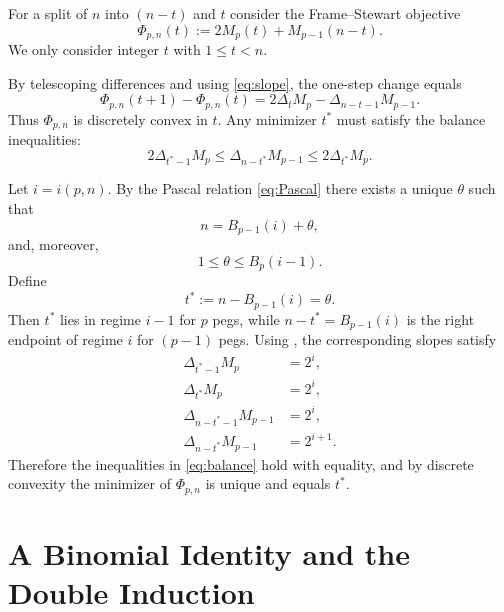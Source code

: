 \documentclass[11pt]{article}
\theoremstyle{definition}
\begin{document}
For a split of $n$ into $(n-t)$ and $t$ consider the Frame--Stewart objective
\begin{equation}\label{eq:phi}
\Phi_{p,n}(t) := 2M_p(t) + M_{p-1}(n-t).
\end{equation}
We only consider integer $t$ with $1 \leq t < n$.

By telescoping differences and using \eqref{eq:slope}, the one-step change equals
\begin{equation}\label{eq:phidiff}
\Phi_{p,n}(t+1) - \Phi_{p,n}(t) = 2\Delta_t M_p - \Delta_{n-t-1} M_{p-1}.
\end{equation}
Thus $\Phi_{p,n}$ is discretely convex in $t$. Any minimizer $t^*$ must satisfy the balance inequalities:
\begin{equation}\label{eq:balance}
2\Delta_{t^*-1} M_p \leq \Delta_{n-t^*} M_{p-1} \leq 2\Delta_{t^*} M_p.
\end{equation}

Let $i = i(p,n)$. By the Pascal relation \eqref{eq:Pascal} there exists a unique $\theta$ such that
\begin{equation}\label{eq:thetaA}
n = B_{p-1}(i) + \theta,
\end{equation}
and, moreover,
\begin{equation}\label{eq:thetaB}
1 \leq \theta \leq B_p(i-1).
\end{equation}
Define
\begin{equation}\label{eq:tstar}
t^* := n - B_{p-1}(i) = \theta.
\end{equation}
Then $t^*$ lies in regime $i-1$ for $p$ pegs, while $n - t^* = B_{p-1}(i)$ is the right endpoint of regime $i$ for $(p-1)$ pegs. Using , the corresponding slopes satisfy
\begin{align}
\Delta_{t^*-1} M_p &= 2^i, \label{eq:d1} \\
\Delta_{t^*} M_p &= 2^i, \label{eq:d2} \\
\Delta_{n-t^*-1} M_{p-1} &= 2^i, \label{eq:d3} \\
\Delta_{n-t^*} M_{p-1} &= 2^{i+1}. \label{eq:d4}
\end{align}
Therefore the inequalities in \eqref{eq:balance} hold with equality, and by discrete convexity the minimizer of $\Phi_{p,n}$ is unique and equals $t^*$.

\section{A Binomial Identity and the Double Induction}
\end{document}
